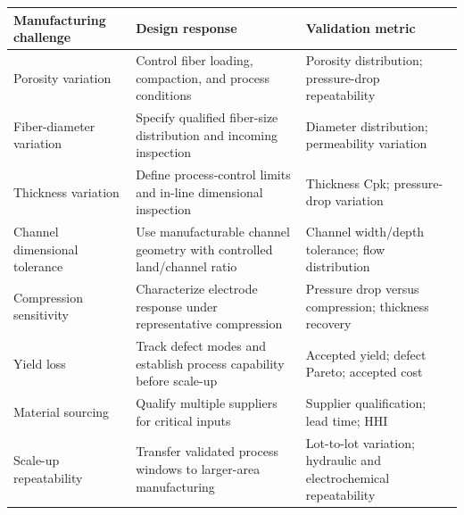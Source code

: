 \documentclass[11pt,letterpaper]{article}
\begin{document}
\begin{samepage}
\small
\begin{center}
\begin{tabularx}{\textwidth}{
    L{0.27\textwidth}
    L{0.36\textwidth}
    L{0.29\textwidth}
}
\toprule
\textbf{Manufacturing challenge}
&
\textbf{Design response}
&
\textbf{Validation metric}
\\
\midrule

Porosity variation
&
Control fiber loading, compaction, and process conditions
&
Porosity distribution; pressure-drop repeatability
\\

Fiber-diameter variation
&
Specify qualified fiber-size distribution and incoming inspection
&
Diameter distribution; permeability variation
\\

Thickness variation
&
Define process-control limits and in-line dimensional inspection
&
Thickness Cpk; pressure-drop variation
\\

Channel dimensional tolerance
&
Use manufacturable channel geometry with controlled land/channel ratio
&
Channel width/depth tolerance; flow distribution
\\

Compression sensitivity
&
Characterize electrode response under representative compression
&
Pressure drop versus compression; thickness recovery
\\

Yield loss
&
Track defect modes and establish process capability before scale-up
&
Accepted yield; defect Pareto; accepted cost
\\

Material sourcing
&
Qualify multiple suppliers for critical inputs
&
Supplier qualification; lead time; HHI
\\

Scale-up repeatability
&
Transfer validated process windows to larger-area manufacturing
&
Lot-to-lot variation; hydraulic and electrochemical repeatability
\\

\bottomrule
\end{tabularx}
\end{center}
\normalsize
\end{samepage}

\end{document}
